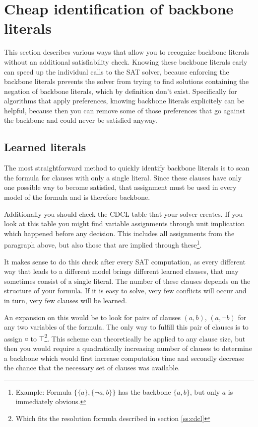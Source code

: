 \section{Cheap identification of backbone literals}
This section describes various ways that allow you to recognize backbone literals without an additional satisfiability check. Knowing these backbone literals early can speed up the individual calls to the SAT solver, because enforcing the backbone literals prevents the solver from trying to find solutions containing the negation of backbone literals, which by definition don't exist. Specifically for algorithms that apply preferences, knowing backbone literals explicitely can be helpful, because then you can remove some of those preferences that go against the backbone and could never be satisfied anyway.



\subsection{Learned literals}
\label{subsec:axiomatic}
The most straightforward method to quickly identify backbone literals is to scan the formula for clauses with only a single literal. Since these clauses have only one possible way to become satisfied, that assignment must be used in every model of the formula and is therefore backbone.

Additionally you should check the CDCL table that your solver creates. If you look at this table you might find variable assignments through unit implication which happened before any decision. This includes all assignments from the paragraph above, but also those that are implied through these\footnote{Example: Formula $\{\{a\},\{\neg a, b\}\}$ has the backbone $\{a,b\}$, but only $a$ is immediately obvious.}.

It makes sense to do this check after every SAT computation, as every different way that leads to a different model brings different learned clauses, that may sometimes consist of a single literal. The number of these clauses depends on the structure of your formula. If it is easy to solve, very few conflicts will occur and in turn, very few clauses will be learned.

An expansion on this would be to look for pairs of clauses $(a,b)$, $(a,\neg b)$ for any two variables of the formula. The only way to fulfill this pair of clauses is to assign $a$ to $\top$\footnote{Which fits the resolution formula described in 
section \ref{ss:cdcl}}. This scheme can theoretically be applied to any clause size, but then you would require a quadratically increasing number of clauses to determine a backbone which would first increase computation time and secondly decrease the chance that the necessary set of clauses was available.

